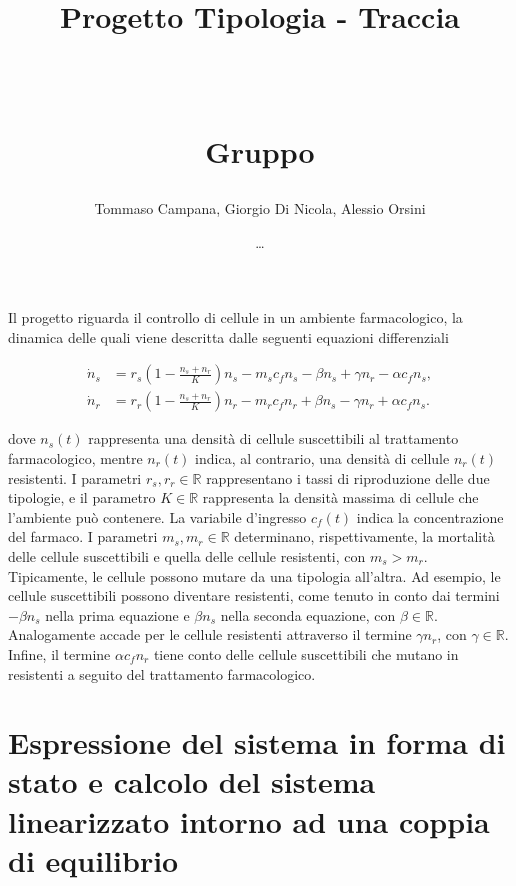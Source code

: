 \documentclass[a4paper, 11pt]{article}
\title{ \vspace{-1in}
		\huge \strut \coursename \strut 
		\\
		\Large  \strut Progetto Tipologia \tipology - Traccia \trace 
		\\
		\Large  \strut \projectname\strut
		\\
		\Large  \strut Gruppo \group\strut
		\vspace{-0.4cm}
}
\author{Tommaso Campana, Giorgio Di Nicola, Alessio Orsini}
\date{\dots}
\begin{document}
\maketitle
\vspace{-0.5cm}

Il progetto riguarda il controllo di cellule in un ambiente farmacologico, la dinamica delle quali viene descritta dalle seguenti equazioni differenziali 

%
\begin{subequations}\label{eq:system}
\begin{align}
\dot{n}_s &= r_s \left( 1 - \frac{n_s + n_r}{K} \right) n_s - m_s c_f n_s - \beta n_s + \gamma n_r - \alpha c_f n_s, \tag{1a} \\
\dot{n}_r &= r_r \left( 1 - \frac{n_s + n_r}{K} \right) n_r - m_r c_f n_r + \beta n_s - \gamma n_r + \alpha c_f n_s. \tag{1b} 
\end{align}
\end{subequations}
%

dove \( n_s(t) \) rappresenta una densità di cellule suscettibili al trattamento
farmacologico, mentre \( n_r(t) \) indica, al contrario, una densità di cellule \( n_r(t) \) resistenti. 
I parametri \( r_s, r_r \in \mathbb{R} \) rappresentano i tassi di riproduzione delle due tipologie, e il parametro \( K \in \mathbb{R} \) rappresenta la densità massima di cellule che l’ambiente può contenere. La variabile d’ingresso \( c_f(t) \) indica la concentrazione del farmaco.
I parametri \( m_s, m_r \in \mathbb{R} \) determinano, rispettivamente, la mortalità delle cellule suscettibili e quella delle cellule resistenti, con \( m_s > m_r \). 
Tipicamente, le cellule possono mutare da una tipologia all’altra. Ad esempio, le cellule suscettibili possono diventare resistenti, come tenuto in conto dai termini \( -\beta n_s \) nella prima equazione e \( \beta n_s \) nella seconda equazione, con \( \beta \in \mathbb{R} \).
Analogamente accade per le cellule resistenti attraverso il termine \( \gamma n_r \), con \( \gamma \in \mathbb{R} \). Infine, il termine \( \alpha c_f n_r \) tiene conto delle cellule suscettibili che mutano in resistenti a seguito del trattamento farmacologico.


\section{Espressione del sistema in forma di stato e calcolo del sistema linearizzato intorno ad una coppia di equilibrio}
\end{document}

